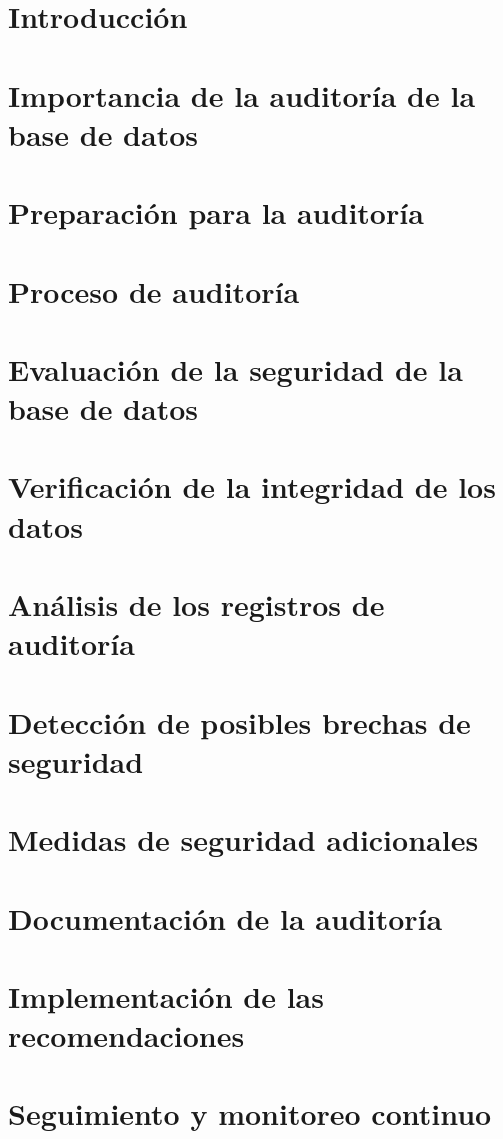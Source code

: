 \documentclass[12pt,a4paper]{article}
\begin{document}

\pagestyle{fancy} \mystyle \newpage %

\section{Introducción}
\section{Importancia de la auditoría de la base de datos}
\section{Preparación para la auditoría}
\section{Proceso de auditoría}
\section{Evaluación de la seguridad de la base de datos}
\section{Verificación de la integridad de los datos}
\section{Análisis de los registros de auditoría}
\section{Detección de posibles brechas de seguridad}
\section{Medidas de seguridad adicionales}
\section{Documentación de la auditoría}
\section{Implementación de las recomendaciones}
\section{Seguimiento y monitoreo continuo}
\end{document}
